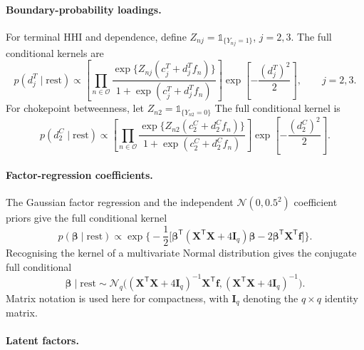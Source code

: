 \documentclass[pdftex,12pt,openright,a4paper,oneside]{book}
\begin{document}
\paragraph{Boundary-probability loadings.}

For terminal HHI and dependence, define
$Z_{nj}=\mathds{1}_{\{Y_{nj}=1\}}$, $j=2,3$.
The full conditional kernels are
\begin{equation}
p(d_j^T\mid\mathrm{rest})
\propto
\left[
\prod_{n\in\mathcal{O}}
\frac{
\exp\{Z_{nj}(c_j^T+d_j^T f_n)\}
}{
1+\exp(c_j^T+d_j^T f_n)
}
\right]
\exp\left[-\frac{(d_j^T)^2}{2}\right],
\qquad j=2,3.
\label{eq:fc_one_loading}
\end{equation}
For chokepoint betweenness, let
$Z_{n2}=\mathds{1}_{\{Y_{n2}=0\}}$
The full conditional kernel is
\begin{equation}
p(d_2^C\mid\mathrm{rest})
\propto 
\left[
\prod_{n\in\mathcal{O}}
\frac{
\exp\{Z_{n2}(c_2^C+d_2^C f_n)\}
}{
1+\exp(c_2^C+d_2^C f_n)
}
\right]
\exp\left[-\frac{(d_2^C)^2}{2}\right].
\label{eq:fc_zero_loading}
\end{equation}

\paragraph{Factor-regression coefficients.}

The Gaussian factor regression and the independent
$\mathcal{N}(0,0.5^2)$ coefficient priors give the
full conditional kernel
\begin{equation}
p(\boldsymbol{\beta}\mid\mathrm{rest})
\propto
\exp\Bigg\{-\frac12\Big[
\boldsymbol{\beta}^{\mathsf T}
(\mathbf{X}^{\mathsf T}\mathbf{X}+4\mathbf{I}_q)
\boldsymbol{\beta}-
2\boldsymbol{\beta}^{\mathsf T}
\mathbf{X}^{\mathsf T}\mathbf{f}
\Big]\Bigg\}.
\label{eq:fc_beta_kernel}
\end{equation}
Recognising the kernel of a multivariate Normal
distribution gives the conjugate full conditional
\begin{equation}
\boldsymbol{\beta}\mid\mathrm{rest}
\sim\mathcal{N}_q\Big(
(\mathbf{X}^{\mathsf T}\mathbf{X}+4\mathbf{I}_q)^{-1}
\mathbf{X}^{\mathsf T}\mathbf{f},
(\mathbf{X}^{\mathsf T}\mathbf{X}+4\mathbf{I}_q)^{-1}
\Big).
\label{eq:fc_beta_normal}
\end{equation}
Matrix notation is used here for compactness, with
$\mathbf{I}_q$ denoting the $q\times q$ identity matrix.

\paragraph{Latent factors.}
\end{document}
